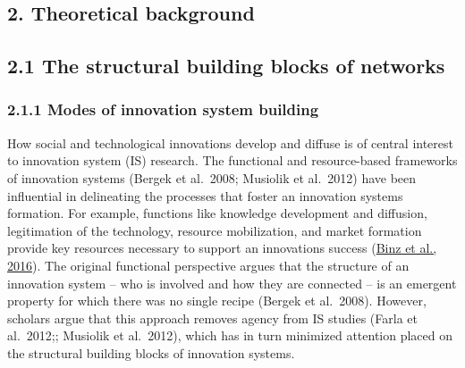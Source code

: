 \documentclass[twoside,12pt,final]{ucthesis-CA2012}
\begin{document}
\begin{ucmainmatter}
\hypertarget{theoretical-background}{%
\section{2. Theoretical background}\label{theoretical-background}}

\hypertarget{the-structural-building-blocks-of-networks}{%
\subsection{2.1 The structural building blocks of networks}\label{the-structural-building-blocks-of-networks}}

\hypertarget{modes-of-innovation-system-building}{%
\subsubsection{2.1.1 Modes of innovation system building}\label{modes-of-innovation-system-building}}

How social and technological innovations develop and diffuse is of
central interest to innovation system (IS) research. The functional and
resource-based frameworks of innovation systems (Bergek et al.~2008;
Musiolik et al.~2012) have been influential in delineating the processes
that foster an innovation system\textquotesingle s formation. For example, functions
like knowledge development and diffusion, legitimation of the
technology, resource mobilization, and market formation provide key
resources necessary to support an innovation\textquotesingle s success (\href{https://www.zotero.org/google-docs/?Sy7y1y}{Binz et al.,
2016}). The original
functional perspective argues that the structure of an innovation system
-- who is involved and how they are connected -- is an emergent property
for which there was no single recipe (Bergek et al.~2008). However,
scholars argue that this approach removes agency from IS studies (Farla
et al.~2012;; Musiolik et al.~2012), which has in turn minimized
attention placed on the structural building blocks of innovation
systems.


\end{ucmainmatter}
\end{document}

